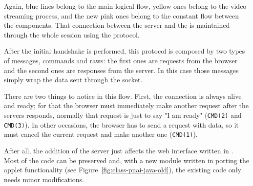 Again, blue lines belong to the main logical flow, yellow ones belong to the video streaming process, and the new pink ones belong to the constant flow between the  components.
That connection between the  server and the   is maintained through the whole session using the  protocol.

After the initial handshake is performed, this protocol is composed by two types of messages, commands and raws: the first ones are requests from the browser and the second ones are responses from the server.
In this case those messages simply wrap the data sent through the  socket.

There are two things to notice in this flow.
First, the connection is always alive and ready; for that the browser must immediately make another request after the servers responds, normally that request is just to say "I am ready" (\texttt{CMD(2)} and \texttt{CMD(3)}).
In other occasions, the browser has to send a request with data, so it must cancel the current request and make another one (\texttt{CMD(1)}).

After all, the addition of the  server just affects the web interface written in .
Most of the code can be preserved and, with a new module written in  porting the  applet functionality (see Figure~\ref{fig:class-pnai-java-old}), the existing code only needs minor modifications.

